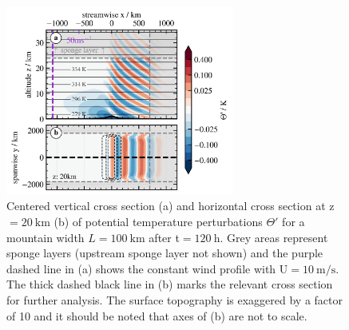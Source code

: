 \begin{figure}[t]
    \centering
    \includegraphics[width=0.67\textwidth]{figures_model/MWs-th-referenceSim.png}
    \caption{Centered vertical cross section (a) and horizontal cross section at z$=\SI{20}{\kilo\meter}$ (b) of potential temperature perturbations $\Theta'$ for a mountain width $L=\SI{100}{\kilo\meter}$ after t$=\SI{120}{\hour}$. Grey areas represent sponge layers (upstream sponge layer not shown) and the purple dashed line in (a) shows the constant wind profile with U$=\SI{10}{\meter\per\second}$. The thick dashed black line in (b) marks the relevant cross section for further analysis. The surface topography is exaggered by a factor of 10 and it should be noted that axes of (b) are not to scale.}
    \label{fig:MWs-reference}
\end{figure}

